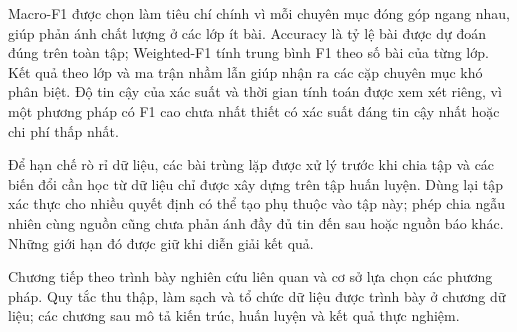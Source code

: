 Macro-F1 được chọn làm tiêu chí chính vì mỗi chuyên mục đóng góp ngang nhau, giúp phản ánh chất lượng ở các lớp ít bài. Accuracy là tỷ lệ bài được dự đoán đúng trên toàn tập; Weighted-F1 tính trung bình F1 theo số bài của từng lớp. Kết quả theo lớp và ma trận nhầm lẫn giúp nhận ra các cặp chuyên mục khó phân biệt. Độ tin cậy của xác suất và thời gian tính toán được xem xét riêng, vì một phương pháp có F1 cao chưa nhất thiết có xác suất đáng tin cậy nhất hoặc chi phí thấp nhất.

Để hạn chế rò rỉ dữ liệu, các bài trùng lặp được xử lý trước khi chia tập và các biến đổi cần học từ dữ liệu chỉ được xây dựng trên tập huấn luyện. Dùng lại tập xác thực cho nhiều quyết định có thể tạo phụ thuộc vào tập này; phép chia ngẫu nhiên cùng nguồn cũng chưa phản ánh đầy đủ tin đến sau hoặc nguồn báo khác. Những giới hạn đó được giữ khi diễn giải kết quả.

Chương tiếp theo trình bày nghiên cứu liên quan và cơ sở lựa chọn các phương pháp. Quy tắc thu thập, làm sạch và tổ chức dữ liệu được trình bày ở chương dữ liệu; các chương sau mô tả kiến trúc, huấn luyện và kết quả thực nghiệm.
